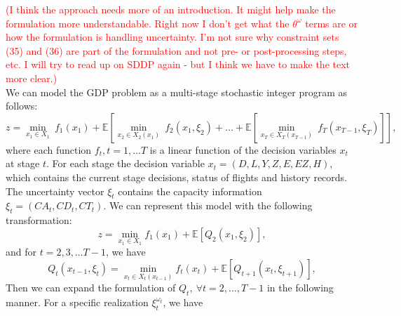 \documentclass[12pt]{article}
\begin{document}
	\newline
	\textcolor{red}{(I think the approach needs more of an introduction.  It might help make the formulation more understandable.  Right now I don't get what the $\theta^\omega$ terms are or how the formulation is handling uncertainty.  I'm not sure why constraint sets (35) and (36) are part of the formulation and not pre- or post-processing steps, etc.  I will try to read up on SDDP again - but I think we have to make the text more clear.)}\\
	\newline
	We can model the GDP problem as a multi-stage stochastic integer program as follows: 
	\begin{equation}
		z = \min_{x_1 \in X_1} \  f_1(x_1) + \mathbb{E} \left[ \min_{x_2 \in X_2(x_1)} \ f_2(x_1, \xi_2) + \dots + \mathbb{E} \left[ \min_{x_T \in X_T(x_{T-1})} \ f_T(x_{T-1}, \xi_T)\right] \right],
	\end{equation}
	where each function \(f_t, t = 1, \dots T\) is a linear function of the decision variables \(x_t\) at stage \(t\). For each stage the decision variable \(x_t = (D,L,Y,Z,E,EZ,H)\), which contains the current stage decisions, status of flights and history records. The uncertainty vector \(\xi_t\) contains the capacity information \(\xi_t = (CA_t, CD_t, CT_t)\). We can represent this model with the following transformation:
	\begin{equation}
		z = \min_{x_1 \in X_1} f_1(x_1) + \mathbb{E}\left[ Q_2(x_1, \xi_2)\right],
	\end{equation}
	and for \(t = 2, 3, \dots T - 1\), we have 
	\begin{equation}
		Q_t(x_{t-1},\xi_t) = \min_{x_t \in X_{t}(x_{t-1})}f_t(x_t) + \mathbb{E} \left[ Q_{t+1}(x_t, \xi_{t+1})\right],
	\end{equation}
	Then we can expand the formulation of \(Q_t,\ \forall t = 2, \dots, T-1\) in the following manner. For a specific realization \(\xi^{\omega_t}_t\), we have
\end{document}
